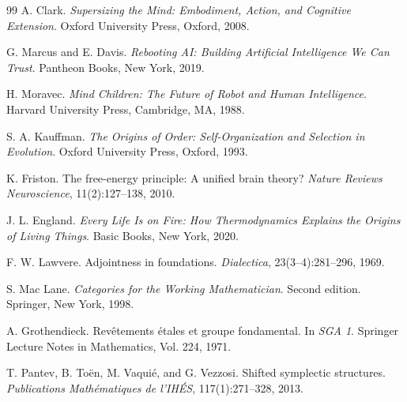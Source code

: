 \documentclass[12pt]{article}
\begin{document}
\begin{thebibliography}{99}
A. Clark.
\textit{Supersizing the Mind: Embodiment, Action, and Cognitive Extension}.
Oxford University Press, Oxford, 2008.

G. Marcus and E. Davis.
\textit{Rebooting AI: Building Artificial Intelligence We Can Trust}.
Pantheon Books, New York, 2019.

H. Moravec.
\textit{Mind Children: The Future of Robot and Human Intelligence}.
Harvard University Press, Cambridge, MA, 1988.

S. A. Kauffman.
\textit{The Origins of Order: Self-Organization and Selection in Evolution}.
Oxford University Press, Oxford, 1993.

K. Friston.
The free-energy principle: A unified brain theory?
\textit{Nature Reviews Neuroscience}, 11(2):127--138, 2010.

J. L. England.
\textit{Every Life Is on Fire: How Thermodynamics Explains the Origins of Living Things}.
Basic Books, New York, 2020.

F. W. Lawvere.
Adjointness in foundations.
\textit{Dialectica}, 23(3--4):281--296, 1969.

S. Mac Lane.
\textit{Categories for the Working Mathematician}.
Second edition.
Springer, New York, 1998.

A. Grothendieck.
Rev\^etements \'etales et groupe fondamental.
In \textit{SGA 1}.
Springer Lecture Notes in Mathematics, Vol. 224, 1971.

T. Pantev, B. To\"en, M. Vaqui\'e, and G. Vezzosi.
Shifted symplectic structures.
\textit{Publications Math\'ematiques de l'IH\'ES}, 117(1):271--328, 2013.

\end{thebibliography}
\end{document}
